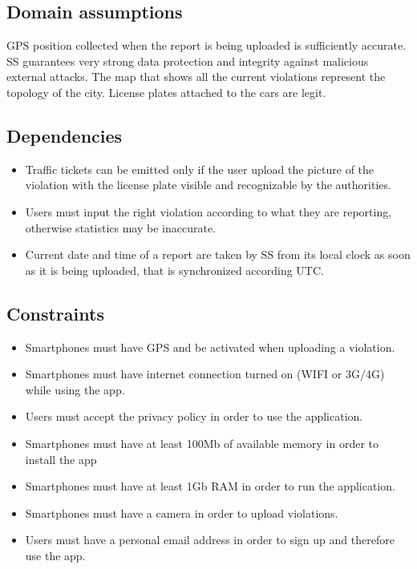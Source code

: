 \documentclass[../RASD.tex]{subfiles}
\begin{document}
    \subsection{Domain assumptions}\label{subsec:domain-assumpiton}
    \begin{enumerate}
         GPS position collected when the report is being uploaded is sufficiently accurate.
        SS guarantees very strong data protection and integrity against malicious external attacks.
         The map that shows all the current violations represent the topology of the city.
         License plates attached to the cars are legit.
    \end{enumerate}
    \subsection{Dependencies}\label{subsec:dependencies}
    \begin{itemize}
        \item Traffic tickets can be emitted only if the user upload the picture of the violation with the license plate visible and recognizable by the authorities.
        \item Users must input the right violation according to what they are reporting, otherwise statistics may be inaccurate.
        \item Current date and time of a report are taken by SS from its local clock as soon as it is being uploaded, that is synchronized according UTC.
    \end{itemize}
    \subsection{Constraints}\label{subsec:constraints}
    \begin{itemize}
        \item Smartphones must have GPS and be activated when uploading a violation.
        \item Smartphones must have internet connection turned on (WIFI or 3G/4G) while using the app.
        \item Users must accept the privacy policy in order to use the application.
        \item Smartphones must have at least 100Mb of available memory in order to install the app
        \item Smartphones must have at least 1Gb RAM in order to run the application.
        \item Smartphones must have a camera in order to upload violations.
        \item Users must have a personal email address in order to sign up and therefore use the app.
    \end{itemize}
\end{document}

